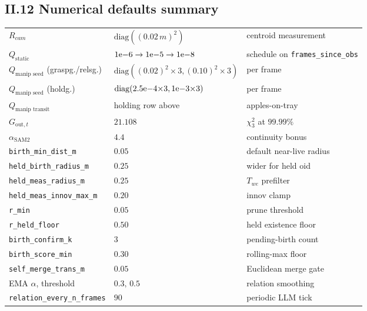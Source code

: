\documentclass[11pt]{article}
\begin{document}
\subsection*{II.12 Numerical defaults summary}

\begin{tabular}{@{}lll@{}}
$R_{cam}$ & $\mathrm{diag}((0.02\,m)^2)$ & centroid measurement \\
$Q_{\text{static}}$ & $1{\rm e}{-6}\to1{\rm e}{-5}\to1{\rm e}{-8}$ & schedule on \texttt{frames\_since\_obs} \\
$Q_{\text{manip seed}}$ (graspg./relsg.) & $\mathrm{diag}((0.02)^2{\times}3,(0.10)^2{\times}3)$ & per frame \\
$Q_{\text{manip seed}}$ (holdg.) & $\mathrm{diag}(2.5{\rm e}{-4}{\times}3,1{\rm e}{-3}{\times}3)$ & per frame \\
$Q_{\text{manip transit}}$ & holding row above & apples-on-tray \\
$G_{\text{out},t}$ & $21.108$ & $\chi^2_3$ at $99.99\%$ \\
$\alpha_{\text{SAM2}}$ & $4.4$ & continuity bonus \\
\texttt{birth\_min\_dist\_m} & $0.05$ & default near-live radius \\
\texttt{held\_birth\_radius\_m} & $0.25$ & wider for held oid \\
\texttt{held\_meas\_radius\_m} & $0.25$ & $T_{we}$ prefilter \\
\texttt{held\_meas\_innov\_max\_m} & $0.20$ & innov clamp \\
\texttt{r\_min} & $0.05$ & prune threshold \\
\texttt{r\_held\_floor} & $0.50$ & held existence floor \\
\texttt{birth\_confirm\_k} & $3$ & pending-birth count \\
\texttt{birth\_score\_min} & $0.30$ & rolling-max floor \\
\texttt{self\_merge\_trans\_m} & $0.05$ & Euclidean merge gate \\
EMA $\alpha$, threshold & $0.3,\,0.5$ & relation smoothing \\
\texttt{relation\_every\_n\_frames} & $90$ & periodic LLM tick \\
\end{tabular}
\end{document}
